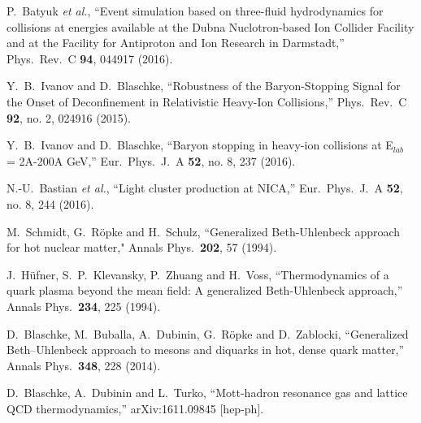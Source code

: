 \documentclass{webofc}
\begin{document}
\begin{thebibliography}{}
  P.~Batyuk {\it et al.},
  ``Event simulation based on three-fluid hydrodynamics for collisions at energies available at the Dubna Nuclotron-based Ion Collider Facility and at the Facility for Antiproton and Ion Research in Darmstadt,''
  Phys.\ Rev.\ C {\bf 94}, 044917 (2016).

  Y.~B.~Ivanov and D.~Blaschke,
  ``Robustness of the Baryon-Stopping Signal for the Onset of Deconfinement in Relativistic Heavy-Ion Collisions,''
  Phys.\ Rev.\ C {\bf 92}, no. 2, 024916 (2015).

  Y.~B.~Ivanov and D.~Blaschke,
  ``Baryon stopping in heavy-ion collisions at E$_{lab}$ = 2A-200A GeV,''
  Eur.\ Phys.\ J.\ A {\bf 52}, no. 8, 237 (2016).
  
  N.-U.~Bastian {\it et al.},
  ``Light cluster production at NICA,''
  Eur.\ Phys.\ J.\ A {\bf 52}, no. 8, 244 (2016).

M.~Schmidt, G.~R\"opke and H.~Schulz,
 ``Generalized Beth-Uhlenbeck approach for hot nuclear matter,"
Annals Phys.\  {\bf 202}, 57 (1994).

  J.~H\"ufner, S.~P.~Klevansky, P.~Zhuang and H.~Voss,
  ``Thermodynamics of a quark plasma beyond the mean field: A generalized Beth-Uhlenbeck approach,''
  Annals Phys.\  {\bf 234}, 225 (1994).

  D.~Blaschke, M.~Buballa, A.~Dubinin, G.~R\"opke and D.~Zablocki,
  ``Generalized Beth--Uhlenbeck approach to mesons and diquarks in hot, dense quark matter,''
  Annals Phys.\  {\bf 348}, 228 (2014).

  D.~Blaschke, A.~Dubinin and L.~Turko,
  ``Mott-hadron resonance gas and lattice QCD thermodynamics,''
  arXiv:1611.09845 [hep-ph].


\end{thebibliography}
\end{document}
